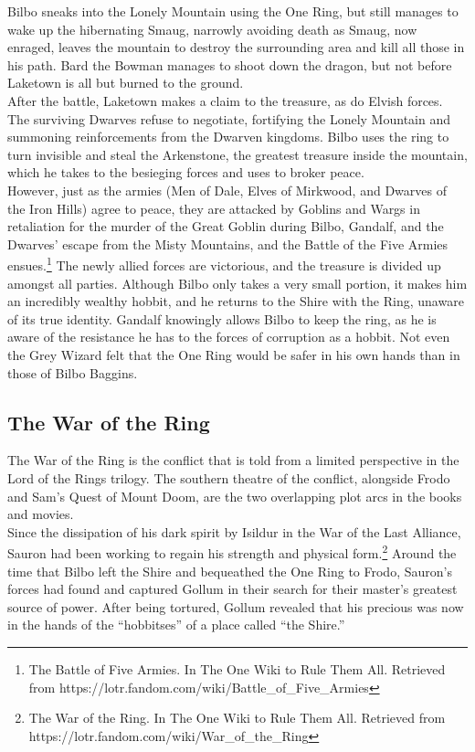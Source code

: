 \documentclass[10pt, letterpaper]{article}
\begin{document}
\noindent \newline Bilbo sneaks into the Lonely Mountain using the One Ring, but still manages to wake up the hibernating Smaug, narrowly avoiding death as Smaug, now enraged, leaves the mountain to destroy the surrounding area and kill all those in his path. Bard the Bowman manages to shoot down the dragon, but not before Laketown is all but burned to the ground. \\   

\noindent After the battle, Laketown makes a claim to the treasure, as do Elvish forces. The surviving Dwarves refuse to negotiate, fortifying the Lonely Mountain and summoning reinforcements from the Dwarven kingdoms. Bilbo uses the ring to turn invisible and steal the Arkenstone, the greatest treasure inside the mountain, which he takes to the besieging forces and uses to broker peace. \\

\noindent However, just as the armies (Men of Dale, Elves of Mirkwood, and Dwarves of the Iron Hills) agree to peace, they are attacked by Goblins and Wargs in retaliation for the murder of the Great Goblin during Bilbo, Gandalf, and the Dwarves’ escape from the Misty Mountains, and the Battle of the Five Armies ensues.\footnote{The Battle of Five Armies. In The One Wiki to Rule Them All. Retrieved from https://lotr.fandom.com/wiki/Battle\_of\_Five\_Armies } The newly allied forces are victorious, and the treasure is divided up amongst all parties. Although Bilbo only takes a very small portion, it makes him an incredibly wealthy hobbit, and he returns to the Shire with the Ring, unaware of its true identity. Gandalf knowingly allows Bilbo to keep the ring, as he is aware of the resistance he has to the forces of corruption as a hobbit. Not even the Grey Wizard felt that the One Ring would be safer in his own hands than in those of Bilbo Baggins. \\

\subsection{The War of the Ring}

\noindent The War of the Ring is the conflict that is told from a limited perspective in the Lord of the Rings trilogy. The southern theatre of the conflict, alongside Frodo and Sam’s Quest of Mount Doom, are the two overlapping plot arcs in the books and movies. \\

\noindent Since the dissipation of his dark spirit by Isildur in the War of the Last Alliance, Sauron had been working to regain his strength and physical form.\footnote{The War of the Ring. In The One Wiki to Rule Them All. Retrieved from https://lotr.fandom.com/wiki/War\_of\_the\_Ring } Around the time that Bilbo left the Shire and bequeathed the One Ring to Frodo, Sauron’s forces had found and captured Gollum in their search for their master’s greatest source of power. After being tortured, Gollum revealed that his precious was now in the hands of the “hobbitses” of a place called “the Shire.” \\
\end{document}
